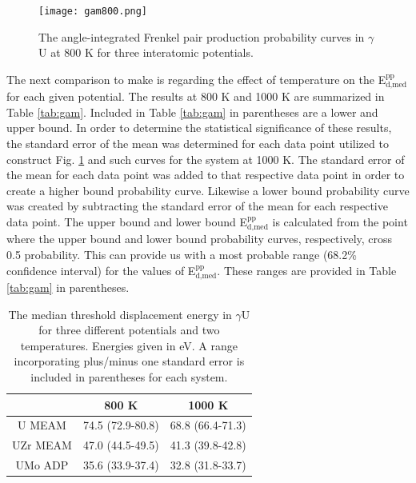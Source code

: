 \documentclass[review]{elsarticle}
\begin{document}
\begin{figure}[h]
 \centering
 \texttt{[image: gam800.png]} %
 \caption{The angle-integrated Frenkel pair production probability curves in $\gamma$U at 800 K for three interatomic potentials.}
 \label{fig:gam800}
\end{figure}

\FloatBarrier

The next comparison to make is regarding the effect of temperature on the E$^{\textrm{pp}}_{\textrm{d,med}}$ for each given potential. The results at 800 K and 1000 K are summarized in Table \ref{tab:gam}. Included in Table \ref{tab:gam} in parentheses are a lower and upper bound. In order to determine the statistical significance of these results, the standard error of the mean was determined for each data point utilized to construct Fig. \ref{fig:gam800} and such curves for the system at 1000 K. The standard error of the mean for each data point was added to that respective data point in order to create a higher bound probability curve. Likewise a lower bound probability curve was created by subtracting the standard error of the mean for each respective data point. The upper bound and lower bound E$^{\textrm{pp}}_{\textrm{d,med}}$ is calculated from the point where the upper bound and lower bound probability curves, respectively, cross 0.5 probability. This can provide us with a most probable range (68.2\% confidence interval) for the values of E$^{\textrm{pp}}_{\textrm{d,med}}$. These ranges are provided in Table \ref{tab:gam} in parentheses. 

\begin{table}[h]
\caption{The median threshold displacement energy in $\gamma$U for three different potentials and two temperatures. Energies given in eV. A range incorporating plus/minus one standard error is included in parentheses for each system.} \label{tab:gam}
\begin{center}
\begin{tabular}{|c|c|c|}
	\hline
	& 800 K & 1000 K \\
	 \hline
	 U MEAM & 74.5 (72.9-80.8) & 68.8 (66.4-71.3) \\
	 UZr MEAM & 47.0 (44.5-49.5) & 41.3 (39.8-42.8) \\
	 UMo ADP & 35.6 (33.9-37.4) & 32.8 (31.8-33.7) \\
	 \hline
\end{tabular}
\end{center}
\label{default}
\end{table}
\end{document}
